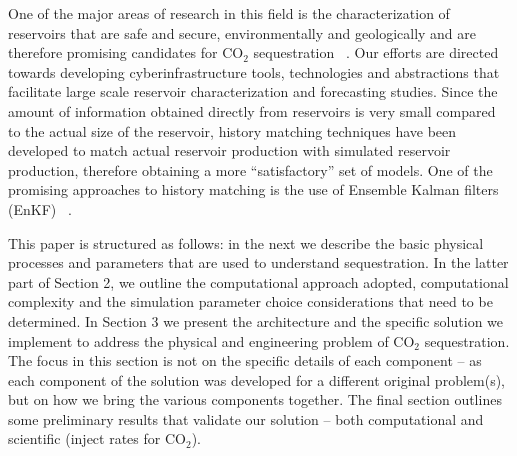\documentclass{rspublic}
\newcommand{\jhanote}[1]{ {\textcolor{red} { ***Jha: #1 }}}
\newcommand{\jhanote}[1]{}
\begin{document}
One of the major areas of research in this field is the
characterization of reservoirs that are safe and secure,
environmentally and geologically and are therefore promising
candidates for CO$_2$ sequestration ~\citep{GeoRPT,Luigi}. Our efforts
are directed towards developing cyberinfrastructure tools,
technologies and abstractions that facilitate large scale reservoir
characterization and forecasting studies.  Since the amount of
information obtained directly from reservoirs is very small compared
to the actual size of the reservoir, history matching techniques have
been developed to match actual reservoir production with simulated
reservoir production, therefore obtaining a more ``satisfactory'' set
of models. One of the promising approaches to history matching is the
use of Ensemble Kalman filters (EnKF) ~\citep{KalmanPaper, DO2007,
  LiEnKF07, DO2006}. 

This paper is structured as follows: in the next we describe the basic
physical processes and parameters that are used to understand
sequestration. In the latter part of Section 2, we outline the
computational approach adopted, computational complexity and the
simulation parameter choice considerations that need to be determined.
In Section 3 we present the architecture and the specific solution we
implement to address the physical and engineering problem of CO$_2$
sequestration. The focus in this section is not on the specific
details of each component -- as each component of the solution was
developed for a different original problem(s), but on how we bring the
various components together.  The final section outlines some
preliminary results that validate our solution -- both computational
and scientific (inject rates for CO$_2$).


\end{document}
